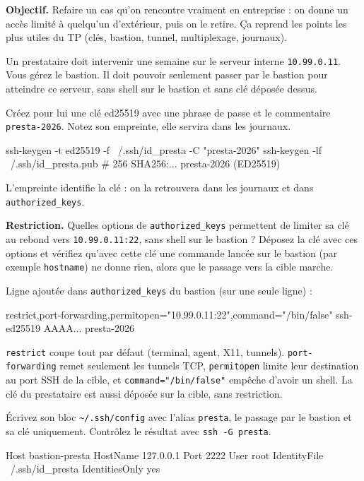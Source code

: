\documentclass[a4paper,10pt]{exam}
\begin{document}
\textbf{Objectif.} Refaire un cas qu'on rencontre vraiment en entreprise : on donne un
accès limité à quelqu'un d'extérieur, puis on le retire. Ça reprend les points les plus
utiles du TP (clés, bastion, tunnel, multiplexage, journaux).

Un prestataire doit intervenir une semaine sur le serveur interne \texttt{10.99.0.11}.
Vous gérez le bastion. Il doit pouvoir seulement passer par le bastion pour atteindre ce
serveur, sans shell sur le bastion et sans clé déposée dessus.

\begin{questions}
\question Créez pour lui une clé ed25519 avec une phrase de passe et le commentaire
\texttt{presta-2026}. Notez son empreinte, elle servira dans les journaux.
\begin{solution}
\begin{bashcode}
ssh-keygen -t ed25519 -f ~/.ssh/id_presta -C "presta-2026"
ssh-keygen -lf ~/.ssh/id_presta.pub
# 256 SHA256:... presta-2026 (ED25519)
\end{bashcode}
L'empreinte identifie la clé : on la retrouvera dans les journaux et dans
\texttt{authorized\_keys}.
\end{solution}
\question \textbf{Restriction.} Quelles options de \texttt{authorized\_keys} permettent de
limiter sa clé au rebond vers \texttt{10.99.0.11:22}, sans shell sur le bastion ?
Déposez la clé avec ces options et vérifiez qu'avec cette clé une commande lancée sur le
bastion (par exemple \texttt{hostname}) ne donne rien, alors que le passage vers la cible
marche.
\begin{solution}
Ligne ajoutée dans \texttt{authorized\_keys} du bastion (sur une seule ligne) :
\begin{bashcode}
restrict,port-forwarding,permitopen="10.99.0.11:22",command="/bin/false" ssh-ed25519 AAAA... presta-2026
\end{bashcode}
\texttt{restrict} coupe tout par défaut (terminal, agent, X11, tunnels).
\texttt{port-forwarding} remet seulement les tunnels TCP, \texttt{permitopen} limite leur
destination au port SSH de la cible, et \texttt{command="/bin/false"} empêche d'avoir un
shell. La clé du prestataire est aussi déposée sur la cible, sans restriction.
\end{solution}
\question Écrivez son bloc \texttt{\textasciitilde/.ssh/config} avec l'alias
\texttt{presta}, le passage par le bastion et sa clé uniquement. Contrôlez le résultat
avec \texttt{ssh -G presta}.
\begin{solution}
\begin{bashcode}
Host bastion-presta
    HostName 127.0.0.1
    Port 2222
    User root
    IdentityFile ~/.ssh/id_presta
    IdentitiesOnly yes


\end{bashcode}
\end{solution}
\end{questions}
\end{document}
